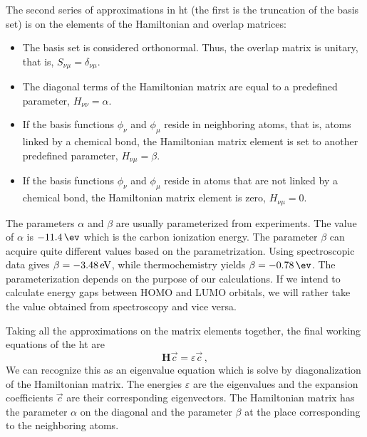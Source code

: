 The second series of approximations in \acrshort{ht} (the first is the truncation of the basis set) is on the elements of the Hamiltonian and overlap matrices:
\begin{itemize}
    \item The basis set is considered orthonormal. Thus, the overlap matrix is unitary, that is, $S_{\nu\mu} = \delta_{\nu\mu}$.
    \item The diagonal terms of the Hamiltonian matrix are equal to a predefined parameter,  $H_{\nu\nu} = \alpha$.
    \item If the basis functions $\phi_\nu$ and $\phi_\mu$ reside in neighboring atoms, that is, atoms linked by a chemical bond, the Hamiltonian matrix element is set to another predefined parameter, $H_{\nu\mu} = \beta$.
    \item If the basis functions $\phi_\nu$ and $\phi_\mu$ reside in atoms that are not linked by a chemical bond, the Hamiltonian matrix element is zero, $H_{\nu\mu} = 0$.
\end{itemize}
The parameters $\alpha$ and $\beta$ are usually parameterized from experiments. The value of $\alpha$ is $\SI{-11{,}4}{\ev}$ which is the carbon ionization energy. The parameter $\beta$ can acquire quite different values based on the parametrization. Using spectroscopic data gives $\beta = \SI{-3{,}48}{\eV}$, while thermochemistry yields $\beta = \SI{-0{,}78}{\ev}$. The parameterization depends on the purpose of our calculations. If we intend to calculate energy gaps between HOMO and LUMO orbitals, we will rather take the value obtained from spectroscopy and vice versa.

Taking all the approximations on the matrix elements together, the final working equations of the \acrlong{ht} are 
\begin{equation}
\mathbf{H}\Vec{c}=\varepsilon\Vec{c}\, ,
\label{eq:huckel7}
\end{equation}
We can recognize this as an eigenvalue equation which is solve by diagonalization of the Hamiltonian matrix. The energies $\varepsilon$ are the eigenvalues and the expansion coefficients $\Vec{c}$ are their corresponding eigenvectors. The Hamiltonian matrix has the parameter $\alpha$ on the diagonal and the parameter $\beta$ at the place corresponding to the neighboring atoms. 

